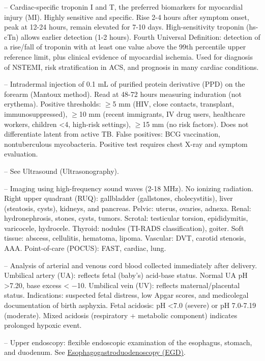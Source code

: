 -- Cardiac-specific troponin I and T, the preferred biomarkers for myocardial injury (MI). Highly sensitive and specific. Rise 2-4 hours after symptom onset, peak at 12-24 hours, remain elevated for 7-10 days. High-sensitivity troponin (hs-cTn) allows earlier detection (1-2 hours). Fourth Universal Definition: detection of a rise/fall of troponin with at least one value above the 99th percentile upper reference limit, plus clinical evidence of myocardial ischemia. Used for diagnosis of NSTEMI, risk stratification in ACS, and prognosis in many cardiac conditions.

-- Intradermal injection of 0.1 mL of purified protein derivative (PPD) on the forearm (Mantoux method). Read at 48-72 hours measuring induration (not erythema). Positive thresholds: \(\ge\)5 mm (HIV, close contacts, transplant, immunosuppressed), \(\ge\)10 mm (recent immigrants, IV drug users, healthcare workers, children <4, high-risk settings), \(\ge\)15 mm (no risk factors). Does not differentiate latent from active TB. False positives: BCG vaccination, nontuberculous mycobacteria. Positive test requires chest X-ray and symptom evaluation.

-- See Ultrasound (Ultrasonography).

-- Imaging using high-frequency sound waves (2-18 MHz). No ionizing radiation. Right upper quadrant (RUQ): gallbladder (gallstones, cholecystitis), liver (steatosis, cysts), kidneys, and pancreas. Pelvic: uterus, ovaries, adnexa. Renal: hydronephrosis, stones, cysts, tumors. Scrotal: testicular torsion, epididymitis, varicocele, hydrocele. Thyroid: nodules (TI-RADS classification), goiter. Soft tissue: abscess, cellulitis, hematoma, lipoma. Vascular: DVT, carotid stenosis, AAA. Point-of-care (POCUS): FAST, cardiac, lung.

-- Analysis of arterial and venous cord blood collected immediately after delivery. Umbilical artery (UA): reflects fetal (baby's) acid-base status. Normal UA pH >7.20, base excess < $-$10. Umbilical vein (UV): reflects maternal/placental status. Indications: suspected fetal distress, low Apgar scores, and medicolegal documentation of birth asphyxia. Fetal acidosis: pH <7.0 (severe) or pH 7.0-7.19 (moderate). Mixed acidosis (respiratory + metabolic component) indicates prolonged hypoxic event.

-- Upper endoscopy: flexible endoscopic examination of the esophagus, stomach, and duodenum. See \hyperlink{Esophagogastroduodenoscopy (EGD)}{Esophagogastroduodenoscopy (EGD)}.

